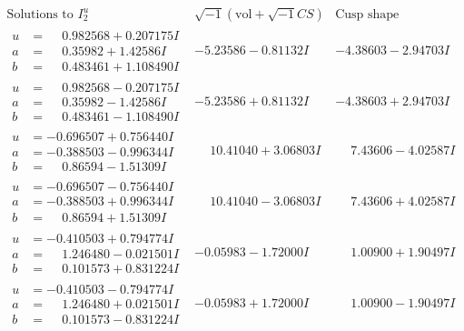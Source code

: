 \documentclass[1p]{elsarticle_modified}
\theoremstyle{definition}
\newcommand{\I}{\sqrt{-1}}
\begin{document}
$$\begin{array}{c|c|c}  
\text{Solutions to }I^u_{2}& \I (\text{vol} + \sqrt{-1}CS) & \text{Cusp shape}\\
 \hline 
\begin{aligned}
u &= \phantom{-}0.982568 + 0.207175 I \\
a &= \phantom{-}0.35982 + 1.42586 I \\
b &= \phantom{-}0.483461 + 1.108490 I\end{aligned}
 & -5.23586 - 0.81132 I & -4.38603 - 2.94703 I \\ \hline\begin{aligned}
u &= \phantom{-}0.982568 - 0.207175 I \\
a &= \phantom{-}0.35982 - 1.42586 I \\
b &= \phantom{-}0.483461 - 1.108490 I\end{aligned}
 & -5.23586 + 0.81132 I & -4.38603 + 2.94703 I \\ \hline\begin{aligned}
u &= -0.696507 + 0.756440 I \\
a &= -0.388503 - 0.996344 I \\
b &= \phantom{-}0.86594 - 1.51309 I\end{aligned}
 & \phantom{-}10.41040 + 3.06803 I & \phantom{-}7.43606 - 4.02587 I \\ \hline\begin{aligned}
u &= -0.696507 - 0.756440 I \\
a &= -0.388503 + 0.996344 I \\
b &= \phantom{-}0.86594 + 1.51309 I\end{aligned}
 & \phantom{-}10.41040 - 3.06803 I & \phantom{-}7.43606 + 4.02587 I \\ \hline\begin{aligned}
u &= -0.410503 + 0.794774 I \\
a &= \phantom{-}1.246480 - 0.021501 I \\
b &= \phantom{-}0.101573 + 0.831224 I\end{aligned}
 & -0.05983 - 1.72000 I & \phantom{-}1.00900 + 1.90497 I \\ \hline\begin{aligned}
u &= -0.410503 - 0.794774 I \\
a &= \phantom{-}1.246480 + 0.021501 I \\
b &= \phantom{-}0.101573 - 0.831224 I\end{aligned}
 & -0.05983 + 1.72000 I & \phantom{-}1.00900 - 1.90497 I \\ \hline\begin{aligned}

\end{aligned}
\end{array}$$
\end{document}
